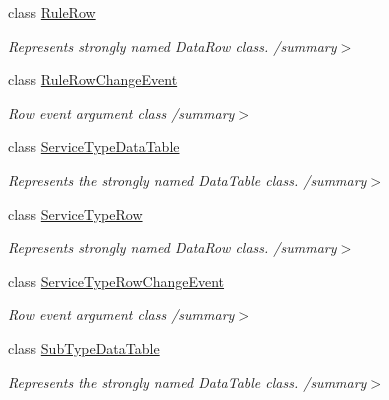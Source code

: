 \begin{DoxyCompactItemize}
class \hyperlink{class_env_int_1_1_win32_1_1_field_tech_1_1_manager_1_1_data_sets_1_1_guide_ware_mobile_data_set_1_1_rule_row}{Rule\+Row}
\begin{DoxyCompactList}\small\item\em Represents strongly named Data\+Row class. /summary$>$ \end{DoxyCompactList}\item 
class \hyperlink{class_env_int_1_1_win32_1_1_field_tech_1_1_manager_1_1_data_sets_1_1_guide_ware_mobile_data_set_1_1_rule_row_change_event}{Rule\+Row\+Change\+Event}
\begin{DoxyCompactList}\small\item\em Row event argument class /summary$>$ \end{DoxyCompactList}\item 
class \hyperlink{class_env_int_1_1_win32_1_1_field_tech_1_1_manager_1_1_data_sets_1_1_guide_ware_mobile_data_set_1_1_service_type_data_table}{Service\+Type\+Data\+Table}
\begin{DoxyCompactList}\small\item\em Represents the strongly named Data\+Table class. /summary$>$ \end{DoxyCompactList}\item 
class \hyperlink{class_env_int_1_1_win32_1_1_field_tech_1_1_manager_1_1_data_sets_1_1_guide_ware_mobile_data_set_1_1_service_type_row}{Service\+Type\+Row}
\begin{DoxyCompactList}\small\item\em Represents strongly named Data\+Row class. /summary$>$ \end{DoxyCompactList}\item 
class \hyperlink{class_env_int_1_1_win32_1_1_field_tech_1_1_manager_1_1_data_sets_1_1_guide_ware_mobile_data_set_ce05812940788b7afd8b26922eaaec12}{Service\+Type\+Row\+Change\+Event}
\begin{DoxyCompactList}\small\item\em Row event argument class /summary$>$ \end{DoxyCompactList}\item 
class \hyperlink{class_env_int_1_1_win32_1_1_field_tech_1_1_manager_1_1_data_sets_1_1_guide_ware_mobile_data_set_1_1_sub_type_data_table}{Sub\+Type\+Data\+Table}
\begin{DoxyCompactList}\small\item\em Represents the strongly named Data\+Table class. /summary$>$ \end{DoxyCompactList}\item 

\end{DoxyCompactItemize}

